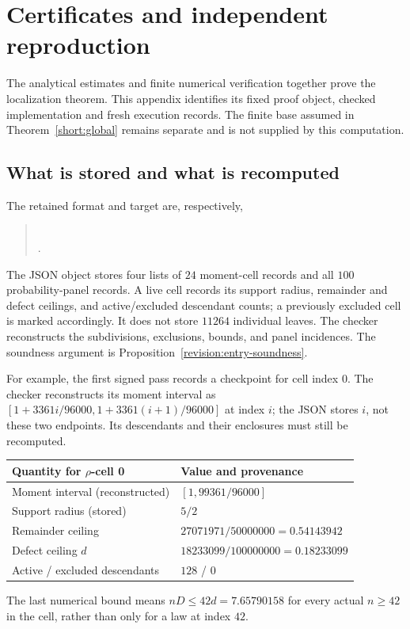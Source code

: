 \section{Certificates and independent reproduction}
\label{revision:reproducibility}
The analytical estimates and finite numerical verification together
prove the localization theorem. This appendix identifies its fixed
proof object, checked implementation and fresh execution records.
The finite base assumed in Theorem~\ref{short:global} remains separate
and is not supplied by this computation.

\subsection{What is stored and what is recomputed}
The retained format and target are, respectively,
\begin{quote}\small
{}\\
.
\end{quote}
The JSON object stores
four lists of $24$ moment-cell records and all $100$ probability-panel
records. A live cell records its support radius, remainder and defect
ceilings, and active/excluded descendant counts; a previously excluded
cell is marked accordingly. It does not store $11264$ individual leaves.
The checker reconstructs the subdivisions, exclusions, bounds, and
panel incidences. The soundness argument is
Proposition~\ref{revision:entry-soundness}.

For example, the first signed pass records a checkpoint for cell index $0$.
The checker reconstructs its moment interval as
$[1+3361i/96000,1+3361(i+1)/96000]$ at index $i$; the JSON stores
$i$, not these two endpoints. Its descendants and their enclosures
must still be recomputed.
\begin{center}\small
\begin{tabular}{@{}ll@{}}
\toprule
Quantity for $\rho$-cell 0 & Value and provenance \\
\midrule
Moment interval (reconstructed) & $[1,99361/96000]$ \\
Support radius (stored) & $5/2$ \\
Remainder ceiling & $27071971/50000000=0.54143942$ \\
Defect ceiling $d$ & $18233099/100000000=0.18233099$ \\
Active / excluded descendants & $128$ / $0$ \\
\bottomrule
\end{tabular}
\end{center}
The last numerical bound means $nD\le42d=7.65790158$ for every
actual $n\ge42$ in the cell, rather than only for a law at index $42$.

